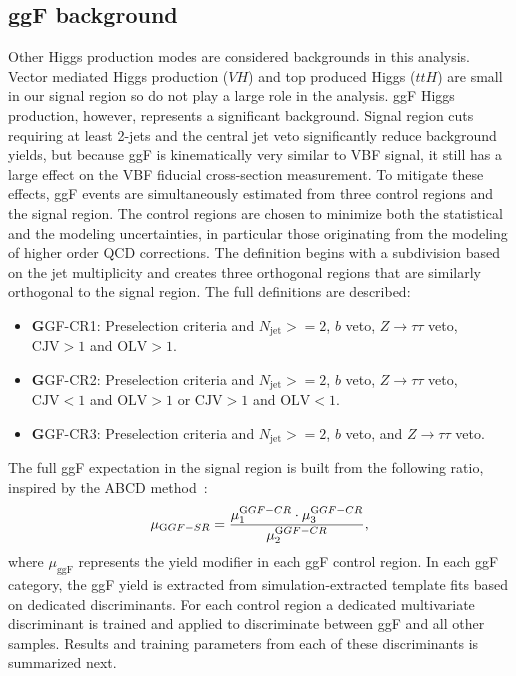\subsection{ggF background}
Other Higgs production modes are considered backgrounds in this analysis. Vector mediated Higgs production ($VH$) and top produced Higgs ($ttH$) are small in our signal region so do not play a large role in the analysis. ggF Higgs production, however, represents a significant background. Signal region cuts requiring at least 2-jets and the central jet veto significantly reduce background yields, but because ggF is kinematically very similar to VBF signal, it still has a large effect on the VBF fiducial cross-section measurement. To mitigate these effects, ggF events are simultaneously estimated from three control regions and the signal region. The control regions are chosen to minimize both the statistical and the modeling uncertainties, in particular those originating from the modeling of higher order QCD corrections. The definition begins with a subdivision based on the jet multiplicity and creates three orthogonal regions that are similarly orthogonal to the signal region. The full definitions are described:  
\begin{itemize} 
\item {\textbf GGF-CR1:} Preselection criteria and $N_{ \text{jet}}>=2$, $b$ veto, $Z\rightarrow\tau\tau$ veto, $\text{CJV} > 1$ and $\text{OLV} > 1$. 
\item {\textbf GGF-CR2:} Preselection criteria and $N_{ \text{jet}}>=2$, $b$ veto, $Z\rightarrow\tau\tau$ veto, $\text{CJV}<1$ and $\text{OLV}>1$ or $\text{CJV}>1$ and $\text{OLV}<1$.
\item {\textbf GGF-CR3:} Preselection criteria and $N_{ \text{jet}}>=2$, $b$ veto, and $Z\rightarrow\tau\tau$ veto. 
\end{itemize} 
The full ggF expectation in the signal region is built from the following ratio, inspired by the ABCD method~\cite{ABCD}: 
\begin{equation}
	\mu_{{\text GGF-SR}} = \frac{\mu^{{\text GGF-CR}}_{1} \cdot\mu^{{\text GGF-CR}}_{3}}{ \mu^{{\text GGF-CR}}_{2}},
\end{equation}
where $\mu_{\text{ggF}}$ represents the yield modifier in each ggF control region. In each ggF category, the ggF yield is extracted from simulation-extracted template fits based on dedicated discriminants. For each control region a dedicated multivariate discriminant is trained and applied to discriminate between ggF and all other samples. Results and training parameters from each of these discriminants is summarized next.

